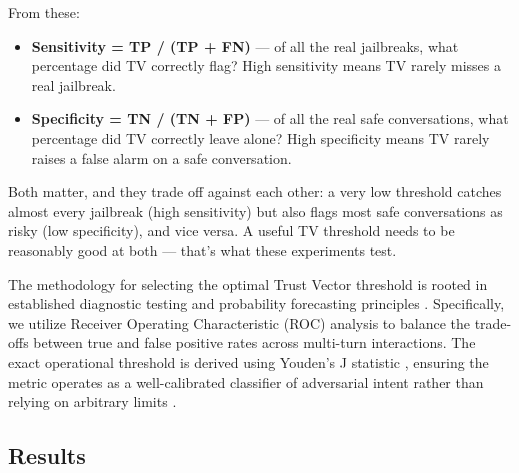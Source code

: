 \documentclass[conference]{IEEEtran}
\begin{document}
From these:
\begin{itemize}
    \item \textbf{Sensitivity = TP / (TP + FN)} — of all the real jailbreaks, what percentage did TV correctly flag? High sensitivity means TV rarely misses a real jailbreak.
    \item \textbf{Specificity = TN / (TN + FP)} — of all the real safe conversations, what percentage did TV correctly leave alone? High specificity means TV rarely raises a false alarm on a safe conversation.
\end{itemize}

Both matter, and they trade off against each other: a very low threshold catches almost every jailbreak (high sensitivity) but also flags most safe conversations as risky (low specificity), and vice versa. A useful TV threshold needs to be reasonably good at both — that’s what these experiments test.

The methodology for selecting the optimal Trust Vector threshold is rooted in established diagnostic testing and probability forecasting principles \cite{ref53}. Specifically, we utilize Receiver Operating Characteristic (ROC) analysis \cite{ref55} to balance the trade-offs between true and false positive rates across multi-turn interactions. The exact operational threshold is derived using Youden’s J statistic \cite{ref54}, ensuring the metric operates as a well-calibrated classifier of adversarial intent rather than relying on arbitrary limits \cite{ref56}.

\subsection{Results}
\end{document}
